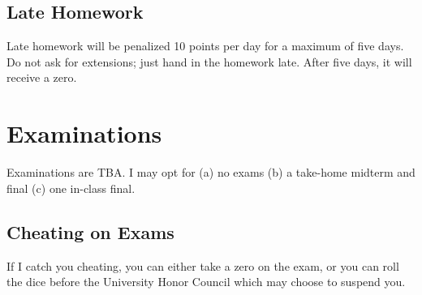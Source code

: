 \documentclass[12pt]{article}
\begin{document}
\subsection*{Late Homework}

Late homework will be penalized 10 points per day for a maximum of five days. Do not ask for extensions; just hand in the homework late. After five days, it will receive a zero.


\section*{Examinations}

Examinations are TBA. I may opt for (a) no exams (b) a take-home midterm and final (c) one in-class final.

%
%


\subsection*{Cheating on Exams}

If I catch you cheating, you can either take a zero on the exam, or you can roll the dice before the University Honor Council which may choose to suspend you.


%
\end{document}
